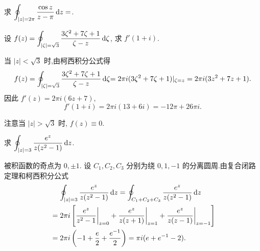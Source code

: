 \begin{exercise}
	求 $\displaystyle\oint_{|z|=2\pi}\frac{\cos z}{z-\pi}\,\mathrm{d} z=$.
\end{exercise}

\begin{example}
	设 $f(z)=\displaystyle\oint_{|\zeta|=\sqrt3}\frac{3\zeta^2+7\zeta+1}{\zeta-z}\,\mathrm{d} \zeta$, 求 $f'(1+i)$.
\end{example}

\begin{solution}
	当 $|z|<\sqrt3$ 时,由柯西积分公式得
	\[
		f(z)=\oint_{|\zeta|=\sqrt3}\frac{3\zeta^2+7\zeta+1}{\zeta-z}\,\mathrm{d} \zeta
		{=2\pi i(3\zeta^2+7\zeta+1)|_{\zeta=z}=2\pi i(3z^2+7z+1).}
	\]
	{因此 $f'(z)=2\pi i(6z+7)$,
		\[f'(1+i)=2\pi i(13+6i)=-12\pi+26\pi i.\]}
\end{solution}
注意当 $|z|>\sqrt3$ 时, $f(z)\equiv0$.

\begin{example}
	求 $\displaystyle\oint_{|z|=3}\frac{e^z}{z(z^2-1)}\,\mathrm{d} z$.
\end{example}

\begin{solution}
	被积函数的奇点为 $0,\pm1$.
	设 $C_1,C_2,C_3$ 分别为绕 $0,1,-1$ 的分离圆周.由复合闭路定理和柯西积分公式
		\begin{align*}
		&\peq\oint_{|z|=3}\frac{e^z}{z(z^2-1)}\diff z
		=\oint_{C_1+C_2+C_3}\frac{e^z}{z(z^2-1)}\diff z\\
		&=2\pi i\left[\frac{e^z}{z^2-1}\bigg|_{z=0}+\frac{e^z}{z(z+1)}\bigg|_{z=1}+\frac{e^z}{z(z-1)}\bigg|_{z=-1}\right]\\
		&=2\pi i\left(-1+\frac e2+\frac{e^{-1}}2\right)=\pi i(e+e^{-1}-2).
		\end{align*}
	\begin{center}
	\end{center}
\end{solution}

